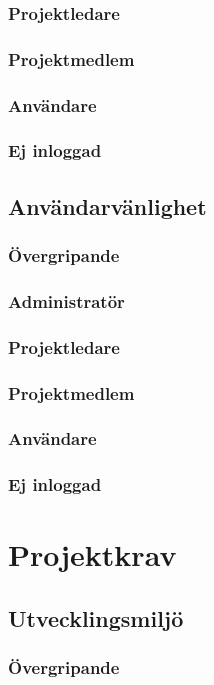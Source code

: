 \documentclass[a4paper]{article}
\begin{document}
		\subsubsection*{Projektledare}
		\subsubsection*{Projektmedlem}
		\subsubsection*{Användare}
		\subsubsection*{Ej inloggad}

	\subsection{Användarvänlighet}
		\subsubsection*{Övergripande}
		\subsubsection*{Administratör}
		\subsubsection*{Projektledare}
		\subsubsection*{Projektmedlem}
		\subsubsection*{Användare}
		\subsubsection*{Ej inloggad}

\section{Projektkrav}
	\subsection{Utvecklingsmiljö}
		\subsubsection*{Övergripande}
\end{document}
